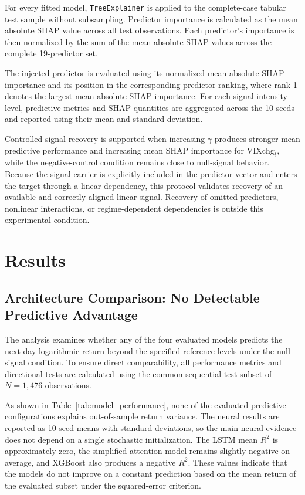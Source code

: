 \documentclass[utf8]{FrontiersinHarvard} %
\newcommand{\rev}[1]{{\color{red}#1}}
\begin{document}
For every fitted model, \texttt{TreeExplainer} is applied to the complete-case tabular test sample without subsampling. Predictor importance is calculated as the mean absolute SHAP value across all test observations. Each predictor's importance is then normalized by the sum of the mean absolute SHAP values across the complete 19-predictor set.

The injected predictor is evaluated using its normalized mean absolute SHAP importance and its position in the corresponding predictor ranking, where rank 1 denotes the largest mean absolute SHAP importance. For each signal-intensity level, predictive metrics and SHAP quantities are aggregated across the 10 seeds and reported using their mean and standard deviation.

Controlled signal recovery is supported when increasing \(\gamma\) produces stronger mean predictive performance and increasing mean SHAP importance for \(\mathrm{VIXchg}_t\), while the negative-control condition remains close to null-signal behavior. Because the signal carrier is explicitly included in the predictor vector and enters the target through a linear dependency, this protocol validates recovery of an available and correctly aligned linear signal. Recovery of omitted predictors, nonlinear interactions, or regime-dependent dependencies is outside this experimental condition.

\section{Results}
\label{sec:Results}

\subsection{Architecture Comparison: No Detectable Predictive Advantage}
\label{subsec:architecture_comparison}

The analysis examines whether any of the four evaluated models predicts the next-day logarithmic return beyond the specified reference levels under the null-signal condition. To ensure direct comparability, all performance metrics and directional tests are calculated using the common sequential test subset of \(N=1{,}476\) observations.

As shown in Table~\ref{tab:model_performance}, none of the evaluated predictive configurations explains out-of-sample return variance. \rev{The neural results are reported as 10-seed means with standard deviations, so the main neural evidence does not depend on a single stochastic initialization.} The LSTM mean \(R^2\) is approximately zero, the simplified attention model remains slightly negative on average, and XGBoost also produces a negative \(R^2\). These values indicate that the models do not improve on a constant prediction based on the mean return of the evaluated subset under the squared-error criterion.
\end{document}
